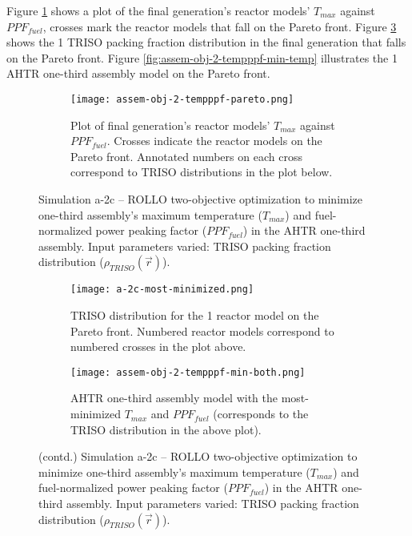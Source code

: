 Figure \ref{fig:assem-obj-2-tempppf-pareto} shows a plot of the final generation's reactor 
models' $T_{max}$ against $PPF_{fuel}$, crosses mark the reactor models that fall on 
the Pareto front.
Figure \ref{fig:assem-obj-2-tempppf-pareto-distr} shows the 1 TRISO packing fraction 
distribution in the final generation that falls on the Pareto front. 
Figure \ref{fig:assem-obj-2-tempppf-min-temp} illustrates the 1 \gls{AHTR} one-third 
assembly model on the Pareto front. 
\begin{figure}[htbp!]
    \centering
    \begin{subfigure}{\textwidth}
        \texttt{[image: assem-obj-2-tempppf-pareto.png]}
        \caption{Plot of final generation's reactor models' $T_{max}$ against 
        $PPF_{fuel}$. 
        Crosses indicate the reactor models on the Pareto front. Annotated numbers 
        on each cross correspond to TRISO distributions in the plot below.}
        \label{fig:assem-obj-2-tempppf-pareto} 
    \end{subfigure}
    \caption{Simulation a-2c -- ROLLO two-objective optimization to minimize 
    one-third assembly's maximum temperature ($T_{max}$) and fuel-normalized power peaking factor 
    ($PPF_{fuel}$) in the \gls{AHTR} one-third assembly. 
    Input parameters varied: TRISO packing fraction distribution ($\rho_{TRISO}(\vec{r})$).}
    \label{fig:assem-obj-2-tempppf}
\end{figure}
\begin{figure}[htbp!]
    \ContinuedFloat
    \begin{subfigure}{\textwidth}
        \centering
        \texttt{[image: a-2c-most-minimized.png]}
        \caption{TRISO distribution for the 1 reactor model on the Pareto front.
        Numbered reactor models correspond to numbered crosses in the plot above. }
        \label{fig:assem-obj-2-tempppf-pareto-distr} 
    \end{subfigure}
    \begin{subfigure}{\textwidth}
        \centering
        \texttt{[image: assem-obj-2-tempppf-min-both.png]}
        \caption{\gls{AHTR} one-third assembly model with the most-minimized $T_{max}$ and 
        $PPF_{fuel}$ (corresponds to the TRISO distribution in the above plot).}
        \label{fig:assem-obj-2-tempppf-min-ppf} 
    \end{subfigure}
    \caption{(contd.) Simulation a-2c -- ROLLO two-objective optimization to minimize 
    one-third assembly's maximum temperature ($T_{max}$) and fuel-normalized power peaking factor 
    ($PPF_{fuel}$) in the \gls{AHTR} one-third assembly. 
    Input parameters varied: TRISO packing fraction distribution ($\rho_{TRISO}(\vec{r})$).}
\end{figure}

